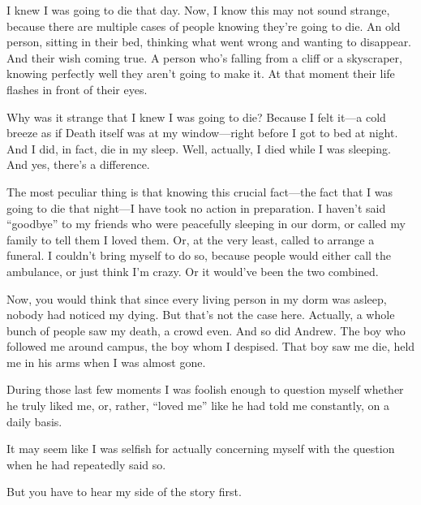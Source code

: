 I knew I was going to die that day. Now, I know this may not sound strange, because there are multiple cases of people knowing they’re going to die. An old person, sitting in their bed, thinking what went wrong and wanting to disappear. And their wish coming true. A person who’s falling from a cliff or a skyscraper, knowing perfectly well they aren’t going to make it. At that moment their life flashes in front of their eyes.

Why was it strange that I knew I was going to die? Because I felt it—a cold breeze as if Death itself was at my window—right before I got to bed at night. And I did, in fact, die in my sleep. Well, actually, I died while I was sleeping. And yes, there’s a difference.

The most peculiar thing is that knowing this crucial fact—the fact that I was going to die that night—I have took no action in preparation. I haven’t said “goodbye” to my friends who were peacefully sleeping in our dorm, or called my family to tell them I loved them. Or, at the very least, called to arrange a funeral. I couldn’t bring myself to do so, because people would either call the ambulance, or just think I’m crazy. Or it would’ve been the two combined.

Now, you would think that since every living person in my dorm was asleep, nobody had noticed my dying. But that’s not the case here. Actually, a whole bunch of people saw my death, a crowd even. And so did Andrew. The boy who followed me around campus, the boy whom I despised. That boy saw me die, held me in his arms when I was almost gone.

During those last few moments I was foolish enough to question myself whether he truly liked me, or, rather, “loved me” like he had told me constantly, on a daily basis.

It may seem like I was selfish for actually concerning myself with the question when he had repeatedly said so.

But you have to hear my side of the story first.